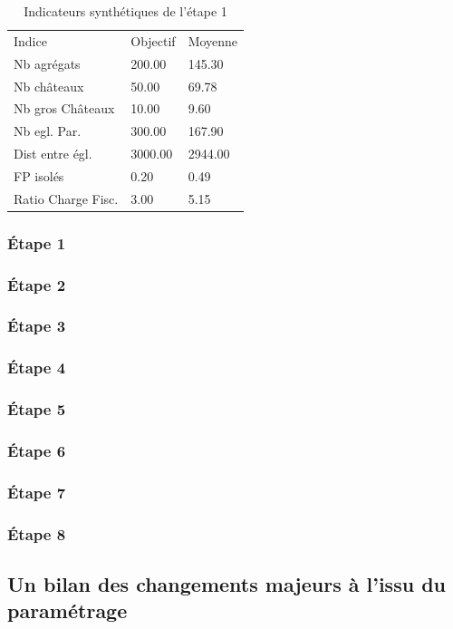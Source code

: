 \documentclass[12pt, a4paper, oneside]{book}
\begin{document}
	\begin{table}[]
		\centering
		\caption{Indicateurs synthétiques de l'étape 1}
		\label{my-label}
		\begin{tabular}{lll}
			Indice             & Objectif & Moyenne \\
			Nb agrégats        & 200.00   & 145.30  \\
			Nb châteaux        & 50.00    & 69.78   \\
			Nb gros  Châteaux  & 10.00    & 9.60    \\
			Nb egl. Par.       & 300.00   & 167.90  \\
			Dist entre égl.    & 3000.00  & 2944.00 \\
			FP isolés          & 0.20     & 0.49    \\
			Ratio Charge Fisc. & 3.00     & 5.15   
		\end{tabular}
	\end{table}
	
	\subsubsection{Étape 1}
	\subsubsection{Étape 2}
	\subsubsection{Étape 3}
	\subsubsection{Étape 4}
	\subsubsection{Étape 5}
	\subsubsection{Étape 6}
	\subsubsection{Étape 7}
	\subsubsection{Étape 8}
	
	\subsection{Un bilan des changements majeurs à l'issu du paramétrage}
	
\end{document}

